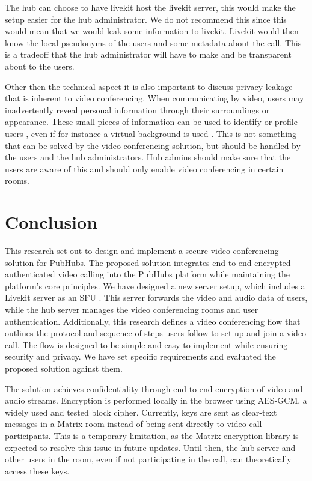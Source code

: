 \documentclass{report}
\begin{document}
The hub can choose to have livekit host the livekit server, this would make the setup easier for the hub administrator.
We do not recommend this since this would mean that we would leak some information to livekit. Livekit would then know
the local pseudonyms of the users and some metadata about the call. This is a tradeoff that the hub administrator will
have to make and be transparent about to the users.

Other then the technical aspect it is also important to discuss privacy leakage that is inherent to video conferencing.
When communicating by video, users may inadvertently reveal personal information through their surroundings or
appearance. These small pieces of information can be used to identify or profile users \cite{Kagan_Alpert_Fire_2024},
even if for instance a virtual background is used \cite{Hilgefort_Arp_Rieck_2021}. This is not something that can be solved by the video conferencing solution, but
should be handled by the users and the hub administrators. Hub admins should make sure that the users are aware of
this and should only enable video conferencing in certain rooms.

\chapter{Conclusion}
This research set out to design and implement a secure video conferencing solution for PubHubs. The proposed
solution integrates end-to-end encrypted authenticated video calling into the PubHubs platform while maintaining
the platform's core principles. We have designed a new server setup, which includes a Livekit server as an SFU .
This server forwards the video and audio data of users, while the hub server manages the video conferencing rooms
and user authentication. Additionally, this research defines a video conferencing flow that outlines the protocol
and sequence of steps users follow to set up and join a video call. The flow is designed to be simple and easy to
implement while ensuring security and privacy. We have set specific requirements and evaluated the proposed
solution against them.

The solution achieves confidentiality through end-to-end encryption of video and audio streams. Encryption is
performed locally in the browser using AES-GCM, a widely used and tested block cipher. Currently, keys are sent as
clear-text messages in a Matrix room instead of being sent directly to video call participants. This is a temporary
limitation, as the Matrix encryption library is expected to resolve this issue in future updates. Until then, the
hub server and other users in the room, even if not participating in the call, can theoretically access these keys.
\end{document}
